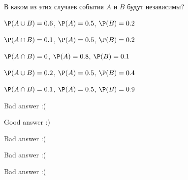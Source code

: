 
\begin{question}
В каком из этих случаев события \(A\) и \(B\) будут независимы?
\begin{answerlist}
  \item \(\P(A \cup B) = 0.6\), \(\P (A) = 0.5\), \(\P(B) = 0.2\)
  \item \(\P(A \cap B) = 0.1\), \(\P (A) = 0.5\), \(\P(B) = 0.2\)
  \item \(\P(A \cap B) = 0\), \(\P (A) = 0.8\), \(\P(B) = 0.1\)
  \item \(\P(A \cup B) = 0.2\), \(\P (A) = 0.5\), \(\P(B) = 0.4\)
  \item \(\P(A \cap B) = 0.1\), \(\P (A) = 0.5\), \(\P(B) = 0.9\)
\end{answerlist}
\end{question}

\begin{solution}
\begin{answerlist}
  \item Bad answer :(
  \item Good answer :)
  \item Bad answer :(
  \item Bad answer :(
  \item Bad answer :(
\end{answerlist}
\end{solution}

